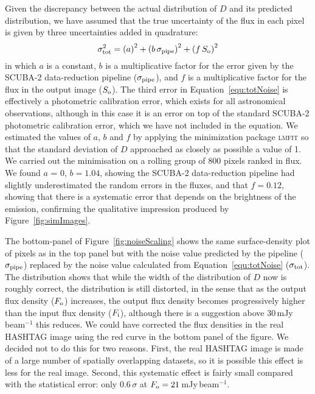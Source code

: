 \documentclass[a4paper,fleqn,usenatbib, twocolumn]{aastex63}
\begin{document}
Given the discrepancy between the actual distribution of $D$ and
its predicted distribution, we have assumed that
the true uncertainty
of the flux in each pixel is given by three uncertainties added in
quadrature:
\begin{equation}
\sigma_{\rm tot}^{2} = \left(a\right)^{2} + \left(b \,\sigma_{\rm pipe}\right)^2 + \left(f\,S_{\rm o}\right)^{2}
\label{equ:totNoise}
\end{equation}
in which $a$ is a constant, $b$ is a multiplicative factor
for the error given by the SCUBA-2 data-reduction pipeline
($\sigma_{\rm pipe}$), and $f$ is a multiplicative
factor for the flux in the output image ($S_{\rm o}$). 
The third error in Equation~\ref{equ:totNoise} is effectively a photometric
calibration error, which exists for all astronomical observations,
although in this case it is an error on top 
of the standard SCUBA-2 photometric calibration error,
which we have not included in the equation.
We estimated the values
of $a$, $b$ and $f$ by applying the 
minimization package
\textsc{lmfit} \citep{lmfit} so that the standard deviation of $D$ 
approached as closely as possible a value of 1. We carried out the minimisation
on a rolling group of 800 pixels ranked in flux.
We found $a$ = 0,
$b = 1.04$, showing the SCUBA-2 data-reduction pipeline had slightly
underestimated the random errors in the fluxes, and
that $f=0.12$, showing that there is a systematic error that depends
on the brightness of the emission, confirming the qualitative impression
produced by Figure~\ref{fig:simImages}. 

The bottom-panel of Figure~\ref{fig:noiseScaling} shows the same
surface-density plot of pixels as in the top panel but with the noise
value predicted by the pipeline ($\sigma_{\rm pipe}$) replaced by the noise value
calculated from Equation~\ref{equ:totNoise} ($\sigma_{\rm tot}$). The distribution shows that while the
width of the distribution of $D$ now is roughly correct, the distribution is still distorted, in the sense that as the output flux density ($F_{\rm o}$) increases, the
output flux density becomes progressively higher than the input flux density
($F_{\rm i}$), although there is a suggestion above 30\,mJy\,beam$^{-1}$ this reduces. We could have corrected the flux densities in the real HASHTAG image
using the red curve in the bottom panel of the figure. 
We decided not to do this for two reasons. First, the real HASHTAG image
is made of a large number of spatially overlapping datasets, so it is possible
this effect is less for the real image. Second, this systematic effect is fairly small compared with the statistical error: only 0.6\,$\sigma$ at $F_{\rm o} = 21$\,mJy\,beam$^{-1}$.
\end{document}
